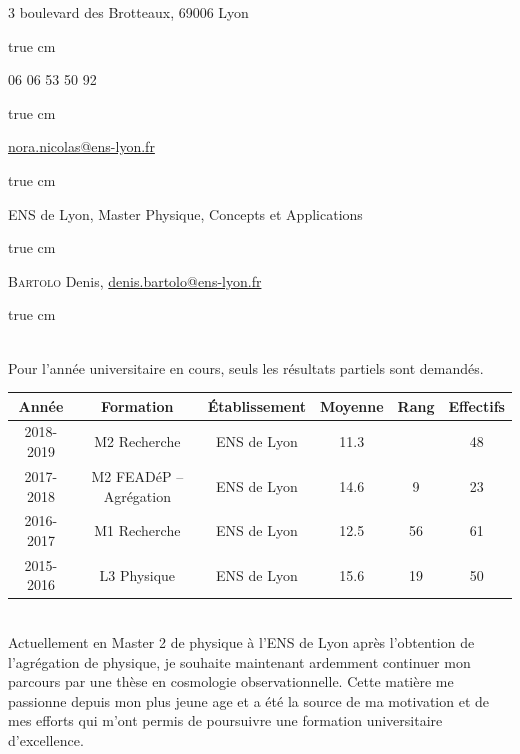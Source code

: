 \documentclass[11pt,a4]{article}
\begin{document}

3 boulevard des Brotteaux, 69006 Lyon

 true cm

06 06 53 50 92

 true cm

\href{mailto:nora.nicolas@ens-lyon.fr}{nora.nicolas@ens-lyon.fr}

 true cm

ENS de Lyon, Master Physique, Concepts et Applications

 true cm

\textsc{Bartolo} Denis, \href{mailto:denis.bartolo@ens-lyon.fr}{denis.bartolo@ens-lyon.fr}

 true cm

 \\ Pour l'année universitaire en cours, seuls les résultats
partiels sont demandés.

\begin{center}
    \begin{tabular}{|c|c|c|c|c|c|} \cline{1-6}
        Année     & Formation               & Établissement & Moyenne & Rang & Effectifs \\ \hline
        2018-2019 & M2 Recherche            & ENS de Lyon   & 11.3    &      & 48 \\ \hline
        2017-2018 & M2 FEADéP -- Agrégation & ENS de Lyon   & 14.6    & 9    & 23 \\ \hline
        2016-2017 & M1 Recherche            & ENS de Lyon   & 12.5    & 56   & 61 \\ \hline
        2015-2016 & L3 Physique             & ENS de Lyon   & 15.6    & 19   & 50 \\ \hline
    \end{tabular}
\end{center}

\newpage
{}\\

Actuellement en Master 2 de physique à l'ENS de Lyon après
l'obtention de l'agrégation de  physique, je souhaite maintenant 
ardemment  continuer mon parcours par une thèse 
en cosmologie observationnelle. Cette matière me passionne depuis mon
plus jeune age et a été la source de ma motivation et de mes efforts
qui m'ont permis de poursuivre une formation universitaire
d'excellence. 
\end{document}
